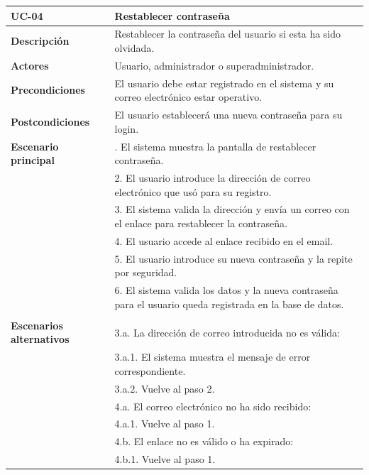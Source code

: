 \begin{table}[H]
  \begin{center}
    \begin{tabularx}{16.4cm}{|l|X|}
      \hline
      \textbf{UC-04} & \textbf{Restablecer contraseña}\\
      \hline
      \textbf{Descripción} & Restablecer la contraseña del usuario si esta ha sido olvidada.\\
      \hline
      \textbf{Actores} & Usuario, administrador o superadministrador.\\
      \hline
      \textbf{Precondiciones} & El usuario debe estar registrado en el sistema y su correo electrónico estar operativo.\\
      \hline
      \textbf{Postcondiciones} & El usuario establecerá una nueva contraseña para su login.\\
      \hline
      \textbf{Escenario principal} & \smallskip 1. El sistema muestra la pantalla de restablecer contraseña. \\
      & 2. El usuario introduce la dirección de correo electrónico que usó para su registro.\\
      & 3. El sistema valida la dirección y envía un correo con el enlace para restablecer la contraseña.\\
      & 4. El usuario accede al enlace recibido en el email.\\
      & 5. El usuario introduce su nueva contraseña y la repite por seguridad.\\
      & 6. El sistema valida los datos y la nueva contraseña para el usuario queda registrada en la base de datos.\\
      & \\
      \hline
      \textbf{Escenarios alternativos} & \smallskip  3.a. La dirección de correo introducida no es válida:\\
      & \hspace{0.3cm} 3.a.1. El sistema muestra el mensaje de error correspondiente.\\
      & \hspace{0.3cm} 3.a.2. Vuelve al paso 2.\\
      & 4.a. El correo electrónico no ha sido recibido:\\
      & \hspace{0.3cm} 4.a.1. Vuelve al paso 1.\\
      & 4.b. El enlace no es válido o ha expirado:\\
      & \hspace{0.3cm} 4.b.1. Vuelve al paso 1.\\

\end{tabularx}
\end{center}
\end{table}
